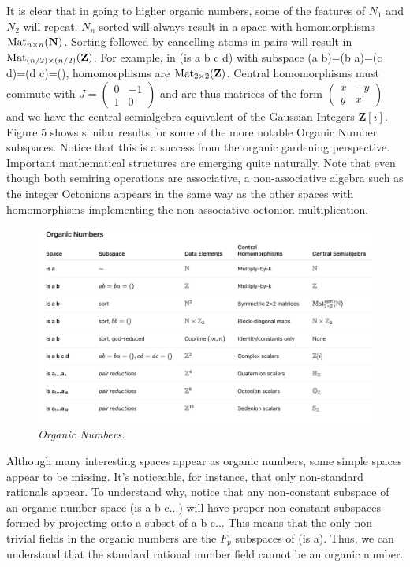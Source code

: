 \documentclass[11pt]{article}
\begin{document}
     It is clear that in going to higher organic numbers, some of the features of $N_1$ and $N_2$ will repeat.  $N_n$ sorted 
 will always result in a space with homomorphisms ${\rm Mat}_{n\times n}(\mathbf N)$.  Sorting followed by cancelling 
 atoms in pairs will result in ${\rm Mat}_{(n/2)\times (n/2)}(\mathbf Z)$.  For example, in (is a b c d) with subspace 
 (a b)=(b a)=(c d)=(d c)=(), homomorphisms are ${\rm Mat}_{2\times 2}(\mathbf Z)$.  Central homomorphisms must 
 commute with 
 $
J=
\left (
\begin{array}{cc} 
0 & -1 \\ 1 & 0 
\end{array}
\right ) 
$
and are thus matrices of the form 
$
\left (
\begin{array}{cc} 
x & -y \\ y & x 
\end{array}
\right ) 
$
and we have the central semialgebra equivalent of the Gaussian Integers ${\mathbf Z}[i]$.  
Figure 5 shows similar results for some of the more notable Organic Number subspaces.  
Notice that this is a success from the organic gardening perspective.  Important mathematical 
structures are emerging quite naturally.  Note that even though both semiring operations 
are associative, a non-associative algebra such as the integer Octonions appears in the 
same way as the other spaces with homomorphisms implementing the non-associative octonion 
multiplication.  
 
\begin{figure}[h]
\centering
\includegraphics[width=1.0\textwidth]{OrganicTable.png}
\caption{{\it Organic Numbers.}}
\end{figure}
\noindent Although many interesting spaces appear as organic numbers, some simple spaces appear to be missing.  It's noticeable, 
for instance, that only non-standard rationals appear.  To understand why, notice that any non-constant subspace of an organic number 
space (is a b c...) will have proper non-constant subspaces formed by projecting onto a subset of a b c... This means that the only non-trivial fields 
in the organic numbers are the $F_p$ subspaces of (is a).  Thus, we can understand that the standard rational number field 
cannot be an organic number. 
\end{document}
